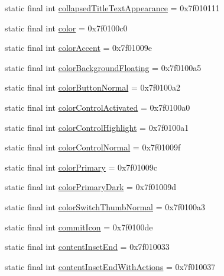 \begin{CompactItemize}
\item 
static final int \hyperlink{classandroid_1_1support_1_1v4_1_1_r_1_1attr_2877729024cc40bad1476ada6761d168}{collapsedTitleTextAppearance} = 0x7f010111
\item 
static final int \hyperlink{classandroid_1_1support_1_1v4_1_1_r_1_1attr_239b693eb28da48ef6be26d686dd3427}{color} = 0x7f0100c0
\item 
static final int \hyperlink{classandroid_1_1support_1_1v4_1_1_r_1_1attr_6331fd88575ac304b32a3d2bff7bc68d}{colorAccent} = 0x7f01009e
\item 
static final int \hyperlink{classandroid_1_1support_1_1v4_1_1_r_1_1attr_2977c16ce14c3cb3667fc00db2114cf4}{colorBackgroundFloating} = 0x7f0100a5
\item 
static final int \hyperlink{classandroid_1_1support_1_1v4_1_1_r_1_1attr_719fb9c3202bbaacaea7285d8268a7aa}{colorButtonNormal} = 0x7f0100a2
\item 
static final int \hyperlink{classandroid_1_1support_1_1v4_1_1_r_1_1attr_c7029205d377997043e1d5b55991b243}{colorControlActivated} = 0x7f0100a0
\item 
static final int \hyperlink{classandroid_1_1support_1_1v4_1_1_r_1_1attr_bdb2f0dd338373d836bf5ed5ba4e29ed}{colorControlHighlight} = 0x7f0100a1
\item 
static final int \hyperlink{classandroid_1_1support_1_1v4_1_1_r_1_1attr_a3a49678d14c0d77b8fbdd7258b75239}{colorControlNormal} = 0x7f01009f
\item 
static final int \hyperlink{classandroid_1_1support_1_1v4_1_1_r_1_1attr_720dbb9e1017e3b43a9438d082ecdaed}{colorPrimary} = 0x7f01009c
\item 
static final int \hyperlink{classandroid_1_1support_1_1v4_1_1_r_1_1attr_513eacc74e2b14f1905e070493fe4910}{colorPrimaryDark} = 0x7f01009d
\item 
static final int \hyperlink{classandroid_1_1support_1_1v4_1_1_r_1_1attr_e6bd0d251b78dcb183b547843a3ad4a7}{colorSwitchThumbNormal} = 0x7f0100a3
\item 
static final int \hyperlink{classandroid_1_1support_1_1v4_1_1_r_1_1attr_be4565e3d2340753b6e802d9d1f53e47}{commitIcon} = 0x7f0100de
\item 
static final int \hyperlink{classandroid_1_1support_1_1v4_1_1_r_1_1attr_3fb28547967fbbce01280d565b1a46b4}{contentInsetEnd} = 0x7f010033
\item 
static final int \hyperlink{classandroid_1_1support_1_1v4_1_1_r_1_1attr_ab49a20b8860361c6adbef033c3c8d10}{contentInsetEndWithActions} = 0x7f010037
\item 

\end{CompactItemize}
